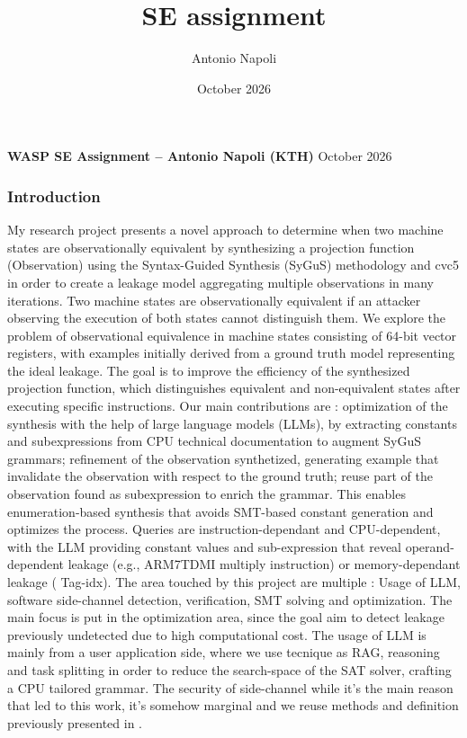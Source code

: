 \documentclass[11pt]{article}
\title{SE assignment}
\author{Antonio Napoli}
\date{October 2026}
\begin{document}
\noindent\textbf{WASP SE Assignment -- Antonio Napoli (KTH)} \hfill October 2026
\vspace{0.5em}

\subsubsection*{Introduction}
My research project presents a novel approach to determine when two machine states are observationally equivalent by synthesizing a projection function (Observation) using the Syntax-Guided Synthesis (SyGuS) methodology and cvc5 in order to create a leakage model aggregating multiple observations in many iterations.
Two machine states are observationally equivalent if an attacker observing the execution of both states cannot distinguish them.
We explore the problem of observational equivalence in machine states consisting of 64-bit vector registers, with examples initially derived from a ground truth model representing the ideal leakage.
The goal is to improve the efficiency of the synthesized projection function, which distinguishes equivalent and non-equivalent states after executing specific instructions. Our main contributions are : optimization of the synthesis with the help of large language models (LLMs), by extracting constants and subexpressions from CPU technical documentation to augment SyGuS grammars; refinement of the observation synthetized, generating example that invalidate the observation with respect to the ground truth; reuse part of the observation found as subexpression to enrich the grammar.  This enables enumeration-based synthesis that avoids SMT-based constant generation and optimizes the process. Queries are instruction-dependant and CPU-dependent, with the LLM providing constant values and sub-expression that reveal operand-dependent leakage (e.g., ARM7TDMI multiply instruction) or memory-dependant leakage ( Tag-idx).
The area touched by this project are multiple : Usage of LLM, software side-channel detection, verification, SMT solving and optimization. 
The main focus is put in the optimization area, since the goal aim to detect leakage previously undetected due to high computational cost.  
The usage of LLM is mainly from a user application side, where we use tecnique as RAG, reasoning and task splitting in order to reduce the search-space of the SAT solver, crafting a CPU tailored grammar.
The security of side-channel while it's the main reason that led to this work, it's somehow marginal and we reuse methods and definition previously presented in \cite{prior}.
\end{document}
